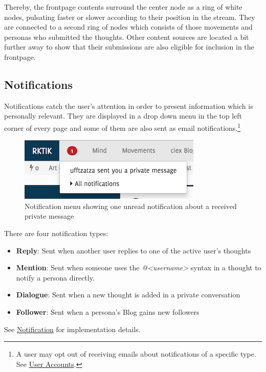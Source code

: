 Thereby, the frontpage contents surround the center node as a ring of
white nodes, pulsating faster or slower according to their position in
the stream. They are connected to a second ring of nodes which consists
of those movements and personas who submitted the thoughts. Other
content sources are located a bit further away to show that their
submissions are also eligible for inclusion in the frontpage.

\subsection{Notifications}\label{notifications}

Notifications catch the user's attention in order to present information
which is personally relevant. They are displayed in a drop down menu in
the top left corner of every page and some of them are also sent as
email notifications.\footnote{A user may opt out of receiving emails
  about notifications of a specific type. See
  \hyperref[user-accounts]{User Accounts}.}

\begin{figure}[htbp]
\centering
\includegraphics{img/notifications.png}
\caption{Notification menu showing one unread notification about a
received private message}
\end{figure}

There are four notification types:

\begin{itemize}
\tightlist
\item
  \textbf{Reply}: Sent when another user replies to one of the active
  user's thoughts
\item
  \textbf{Mention}: Sent when someone uses the
  \emph{@\textless{}username\textgreater{}} syntax in a thought to
  notify a persona directly.
\item
  \textbf{Dialogue}: Sent when a new thought is added in a private
  conversation
\item
  \textbf{Follower}: Sent when a persona's Blog gains new followers
\end{itemize}

See \hyperref[notification]{Notification} for implementation details.

